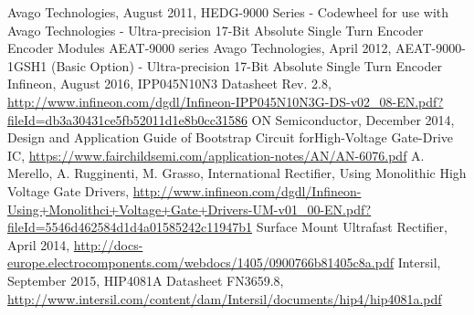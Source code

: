 \begin{thebibliography}{21} %
	Avago Technologies, August 2011, HEDG-9000 Series - Codewheel for use with Avago Technologies - Ultra-precision 17-Bit Absolute Single Turn Encoder
Encoder Modules AEAT-9000 series
	Avago Technologies, April 2012, AEAT-9000-1GSH1 (Basic Option) - Ultra-precision 17-Bit Absolute Single Turn Encoder
	Infineon, August 2016, IPP045N10N3 Datasheet Rev. 2.8, \url{http://www.infineon.com/dgdl/Infineon-IPP045N10N3G-DS-v02_08-EN.pdf?fileId=db3a30431ce5fb52011d1e8b0cc31586}
	ON Semiconductor, December 2014, Design and Application Guide of Bootstrap Circuit forHigh-Voltage Gate-Drive IC, \url{https://www.fairchildsemi.com/application-notes/AN/AN-6076.pdf}
	A. Merello, A. Rugginenti, M. Grasso, International Rectifier, Using Monolithic High Voltage Gate Drivers, \url{http://www.infineon.com/dgdl/Infineon-Using+Monolithci+Voltage+Gate+Drivers-UM-v01_00-EN.pdf?fileId=5546d462584d1d4a01585242c11947b1}
	Surface Mount Ultrafast Rectifier, April 2014, \url{http://docs-europe.electrocomponents.com/webdocs/1405/0900766b81405c8a.pdf}
	Intersil, September 2015, HIP4081A Datasheet FN3659.8, \url{http://www.intersil.com/content/dam/Intersil/documents/hip4/hip4081a.pdf}
\end{thebibliography}